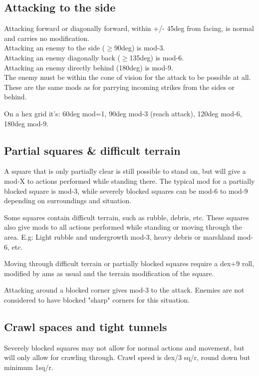 \subsection*{Attacking to the side}
Attacking forward or diagonally forward, within +/- 45deg from facing, is normal and carries no modification. \\
Attacking an enemy to the side ($\ge$90deg) is mod-3. \\
Attacking an enemy diagonally back ($\ge$135deg) is mod-6. \\
Attacking an enemy directly behind (180deg) is mod-9. \\
The enemy must be within the cone of vision for the attack to be possible at all. \\
These are the same mods as for parrying incoming strikes from the sides or behind.

On a hex grid it's: 60deg mod=1, 90deg mod-3 (reach attack), 120deg mod-6, 180deg mod-9.


\subsection*{Partial squares \& difficult terrain}
A square that is only partially clear is still possible to stand on, but will give a mod-X to actions performed while standing there. The typical mod for a partially blocked square is mod-3, while severely blocked squares can be mod-6 to mod-9 depending on surroundings and situation.

Some squares contain difficult terrain, such as rubble, debris, etc. These squares also give mods to all actions performed while standing or moving through the area. E.g: Light rubble and undergrowth mod-3, heavy debris or marshland mod-6, etc.

Moving through difficult terrain or partially blocked squares require a dex+9 roll, modified by ams as usual and the terrain modification of the square.

Attacking around a blocked corner gives mod-3 to the attack. Enemies are not considered to have blocked "sharp" corners for this situation.


\subsection*{Crawl spaces and tight tunnels}
Severely blocked squares may not allow for normal actions and movement, but will only allow for crawling through. Crawl speed is dex/3 sq/r, round down but minimum 1sq/r.

